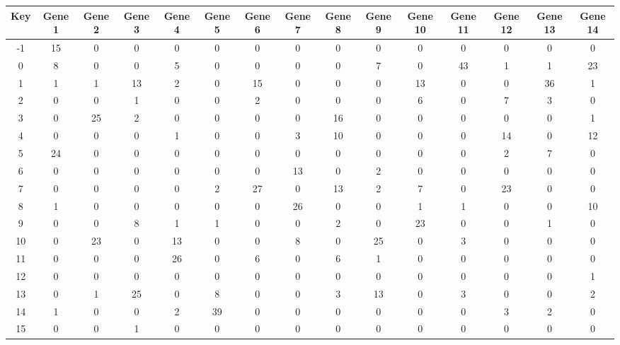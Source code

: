 \begin{tabular}{|c|c|c|c|c|c|c|c|c|c|c|c|c|c|c|}
\hline
Key & Gene 1 & Gene 2 & Gene 3 & Gene 4 & Gene 5 & Gene 6 & Gene 7 & Gene 8 & Gene 9 & Gene 10 & Gene 11 & Gene 12 & Gene 13 & Gene 14 \\
\hline
-1 & 15 & 0 & 0 & 0 & 0 & 0 & 0 & 0 & 0 & 0 & 0 & 0 & 0 & 0 \\
0 & 8 & 0 & 0 & 5 & 0 & 0 & 0 & 0 & 7 & 0 & 43 & 1 & 1 & 23 \\
1 & 1 & 1 & 13 & 2 & 0 & 15 & 0 & 0 & 0 & 13 & 0 & 0 & 36 & 1 \\
2 & 0 & 0 & 1 & 0 & 0 & 2 & 0 & 0 & 0 & 6 & 0 & 7 & 3 & 0 \\
3 & 0 & 25 & 2 & 0 & 0 & 0 & 0 & 16 & 0 & 0 & 0 & 0 & 0 & 1 \\
4 & 0 & 0 & 0 & 1 & 0 & 0 & 3 & 10 & 0 & 0 & 0 & 14 & 0 & 12 \\
5 & 24 & 0 & 0 & 0 & 0 & 0 & 0 & 0 & 0 & 0 & 0 & 2 & 7 & 0 \\
6 & 0 & 0 & 0 & 0 & 0 & 0 & 13 & 0 & 2 & 0 & 0 & 0 & 0 & 0 \\
7 & 0 & 0 & 0 & 0 & 2 & 27 & 0 & 13 & 2 & 7 & 0 & 23 & 0 & 0 \\
8 & 1 & 0 & 0 & 0 & 0 & 0 & 26 & 0 & 0 & 1 & 1 & 0 & 0 & 10 \\
9 & 0 & 0 & 8 & 1 & 1 & 0 & 0 & 2 & 0 & 23 & 0 & 0 & 1 & 0 \\
10 & 0 & 23 & 0 & 13 & 0 & 0 & 8 & 0 & 25 & 0 & 3 & 0 & 0 & 0 \\
11 & 0 & 0 & 0 & 26 & 0 & 6 & 0 & 6 & 1 & 0 & 0 & 0 & 0 & 0 \\
12 & 0 & 0 & 0 & 0 & 0 & 0 & 0 & 0 & 0 & 0 & 0 & 0 & 0 & 1 \\
13 & 0 & 1 & 25 & 0 & 8 & 0 & 0 & 3 & 13 & 0 & 3 & 0 & 0 & 2 \\
14 & 1 & 0 & 0 & 2 & 39 & 0 & 0 & 0 & 0 & 0 & 0 & 3 & 2 & 0 \\
15 & 0 & 0 & 1 & 0 & 0 & 0 & 0 & 0 & 0 & 0 & 0 & 0 & 0 & 0 \\
\hline
\end{tabular}